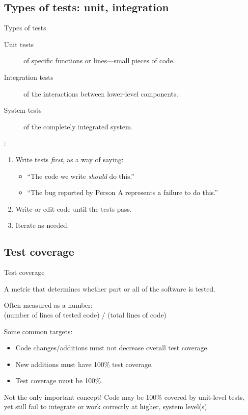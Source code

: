 \documentclass[12pt,aspectratio=169]{beamer}
\begin{document}
\subsection{Types of tests: unit, integration}
\begin{frame}{Types of tests}

  \begin{description}
    \item [Unit tests] of specific functions or lines—small pieces of code.
    \item [Integration tests] of the interactions between lower-level components.
    \item [System tests] of the completely integrated system.
  \end{description}

  \bigskip
  :

  \begin{enumerate}
    \item Write tests \emph{first}, as a way of saying:
          \begin{itemize}
            \item “The code we write \emph{should} do this.”
            \item “The bug reported by Person A represents a failure to do this.”
          \end{itemize}
    \item Write or edit code until the tests pass.
    \item Iterate as needed.
  \end{enumerate}

\end{frame}

\subsection{Test coverage}
\begin{frame}{Test coverage}

  A metric that determines whether part or all of the software is tested.

  \bigskip
  Often measured as a number:\\
  (number of lines of tested code) / (total lines of code)

  \bigskip
  Some common targets:
  \begin{itemize}
    \item Code changes/additions must not decrease overall test coverage.
    \item New additions must have 100\% test coverage.
    \item Test coverage must be 100\%.
  \end{itemize}

  \bigskip
  Not the only important concept!
  Code may be 100\% covered by unit-level tests, yet still fail to integrate or work correctly at higher, system level(s).

\end{frame}
\end{document}
